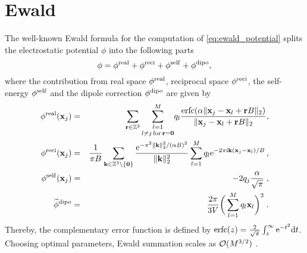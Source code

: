 \chapter{Ewald}
\label{cha:ewald}



The well-known Ewald formula for the computation of \eqref{eq:ewald_potential} splits the
electrostatic potential $\phi$ into the following parts
\begin{equation}\label{eq:ewald}
 \phi = \phi^{\rm real} + \phi^{\rm reci}  + \phi^{\rm self}  + \phi^{\rm dipo},
\end{equation}
where the contribution from real space $ \phi^{\rm real}$, reciprocal space $\phi^{\rm reci}$,
the self-energy $\phi^{\rm self}$ and the dipole correction $\phi^{\rm dipo}$ are given by
\begin{eqnarray}
  \phi^{\rm real}(\mathbf x_j)
  &=& \nonumber
    \sum_{\mathbf r\in \mathbb Z^3}
    \underset{ l\neq j \,{\rm for}\, \mathbf r= \mathbf 0}{\sum_{l=1}^M}
    q_l\frac{{\rm erfc}(\alpha \|\mathbf x_j -\mathbf x_l +\mathbf r B\|_2)}{\|\mathbf x_j -\mathbf x_l +\mathbf r B\|_2},\\
  \phi^{\rm reci}(\mathbf x_j)
  &=& \label{eq:ewald_reci}
    \frac{1}{\pi B} \sum_{\mathbf k\in \mathbb Z^3\setminus\{\mathbf 0\}}
    \frac{{\rm e}^{-\pi^2 \|\mathbf k\|_2^2/(\alpha B)^2}}{\|\mathbf k\|_2^2}
    \sum_{l=1}^M q_l {\rm e}^{-2\pi {\rm i} \mathbf k (\mathbf x_j -\mathbf x_l)/B}\, ,\\
  \phi^{\rm self} (\mathbf x_j)
  &=&
    -2 q_j \frac{\alpha}{\sqrt{\pi}}\; ,\nonumber  \\
  \widetilde\phi^{\rm dipo}
  &=&
    \frac{2\pi}{3V}\bigg(\sum_{l=1}^Mq_{l}\mathbf x_{l}\bigg)^{2}\; .\nonumber %
\end{eqnarray}
Thereby, the complementary error function is defined by $\textrm{erfc}(z) =
\frac{2}{\sqrt{\pi}}\int_z^\infty {\rm e}^{-t^2} {\rm d}t$.
Choosing optimal parameters, Ewald summation scales as ${\cal O}(M^{3/2})$ \cite{kolafa92a}.